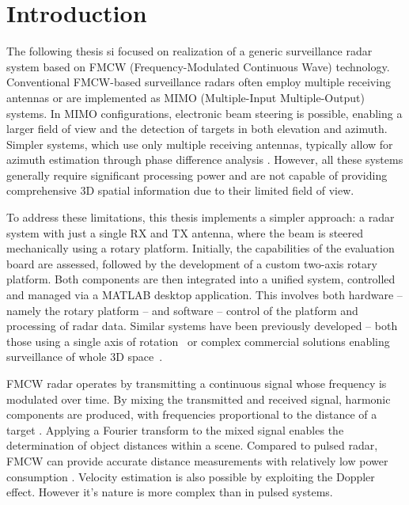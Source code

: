 
\chapter*{Introduction}

The following thesis si focused on realization of a generic surveillance radar system based on FMCW (Frequency-Modulated Continuous Wave) technology.
Conventional FMCW-based surveillance radars often employ multiple receiving antennas or are implemented as MIMO (Multiple-Input Multiple-Output) systems.
In MIMO configurations, electronic beam steering is possible, enabling a larger field of view and the detection of targets in both elevation and azimuth.
Simpler systems, which use only multiple receiving antennas, typically allow for azimuth estimation through phase difference analysis \cite{sandeep2018}.
However, all these systems generally require significant processing power and are not capable of providing comprehensive 3D spatial information due to their limited field of view.

To address these limitations, this thesis implements a simpler approach: a radar system with just a single RX and TX antenna, where the beam is steered mechanically using a rotary platform.
Initially, the capabilities of the \sirad evaluation board are assessed, followed by the development of a custom two-axis rotary platform.
Both components are then integrated into a unified system, controlled and managed via a MATLAB desktop application.
This involves both hardware -- namely the rotary platform -- and software -- control of the platform and processing of radar data.
Similar systems have been previously developed -- both those using a single axis of rotation~\cite{nowok2017, vivet2013} or complex commercial solutions enabling surveillance of whole 3D space~\cite{blighter}.

FMCW radar operates by transmitting a continuous signal whose frequency is modulated over time.
By mixing the transmitted and received signal, harmonic components are produced, with frequencies proportional to the distance of a target \cite{graham2005}.
Applying a Fourier transform to the mixed signal enables the determination of object distances within a scene.
Compared to pulsed radar, FMCW can provide accurate distance measurements with relatively low power consumption \cite{jankiraman2018}.
Velocity estimation is also possible by exploiting the Doppler effect.
However it's nature is more complex than in pulsed systems.


